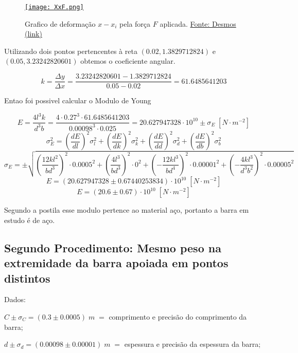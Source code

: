 \documentclass{article}
\begin{document}
\begin{figure}[!ht]
    \centering
    \href{https://www.desmos.com/calculator/lwhpg1by6v}{\texttt{[image: XxF.png]}}
    \caption{Grafico de deformação $x - x_i$ pela força $F$ aplicada. \href{https://www.desmos.com/calculator/lwhpg1by6v}{Fonte: Desmos (link)}}
    \label{gra:XxF}
\end{figure}

Utilizando dois pontos pertencentes à reta $(0.02, 1.3829712824)$ e $(0.05, 3.23242820601)$ obtemos o coeficiente angular.

\[k = \frac{\Delta y}{\Delta x} = \frac{3.23242820601-1.3829712824}{0.05-0.02} = 61.6485641203\]

Entao foi possivel calcular o Modulo de Young

\[E = \frac{4l^3k}{d^3b} = \frac{4\cdot{0.27}^3\cdot61.6485641203}{{0.00098}^3\cdot0.025} = 20.627947328\cdot{10}^{10}\pm\sigma_E\;\left[N\cdot m^{-2}\right]\]
\[\sigma_E^2 = \left(\frac{dE}{dl}\right)^2\sigma_l^2 + 
\left(\frac{dE}{dk}\right)^2\sigma_k^2 + 
\left(\frac{dE}{dd}\right)^2\sigma_d^2 + 
\left(\frac{dE}{db}\right)^2\sigma_b^2\]
\[\sigma_E = \pm\sqrt{
\left(\frac{12kl^2}{bd^3}\right)^2\cdot0.0005^2 +
\left(\frac{4l^3}{bd^3}\right)^2\cdot0^2 + 
\left(-\frac{12kl^3}{bd^4}\right)^2\cdot0.00001^2 + 
\left(-\frac{4kl^3}{d^3b^2}\right)^2\cdot0.00005^2
}\]
\[E = \left(20.627947328\pm0.67440253834\right)\cdot{10}^{10}\;\left[N\cdot m^{-2}\right]\]
\[E = \left(20.6\pm0.67\right)\cdot{10}^{10}\;\left[N\cdot m^{-2}\right]\]

Segundo a postila esse modulo pertence ao material aço, portanto a barra em estudo é de aço.

\subsection{Segundo Procedimento: Mesmo peso na extremidade da barra apoiada em pontos distintos}

Dados:

$C\pm\sigma_C = (0.3\pm0.0005)\;m\;=$ comprimento e precisão do comprimento da barra;

$d\pm\sigma_d = (0.00098\pm0.00001)\;m\;=$ espessura e precisão da espessura da barra;
\end{document}
